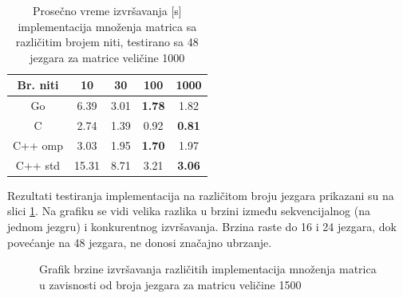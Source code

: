 \documentclass[12pt,oneside]{memoir}
\begin{document}
\begin{table}
\begin{center}
\caption{Prosečno vreme izvršavanja [s] implementacija množenja matrica sa različitim brojem niti, testirano sa 48 jezgara za matrice veličine 1000}
\begin{tabular}{||c||c c c c||}
\hline
Br. niti		&10&30 &100 &1000\\ \hline
Go		&6.39	&3.01&\textbf{1.78}&1.82	 \\ \hline
C		&2.74	&1.39&0.92&\textbf{0.81} \\ \hline
C++ omp	&3.03	&1.95&\textbf{1.70}&1.97 \\ \hline
C++ std	&15.31&8.71&3.21&\textbf{3.06} \\ \hline
\end{tabular}
\label{tab:matrix5}
\end{center}
\end{table}

Rezultati testiranja implementacija na različitom broju jezgara prikazani su na slici \ref{fig:matrix3}. Na grafiku se vidi velika razlika u brzini između sekvencijalnog (na jednom jezgru) i konkurentnog izvršavanja. Brzina raste do 16 i 24 jezgara, dok povećanje na 48 jezgara, ne donosi značajno ubrzanje. 

\begin{figure}
\begin{center}


\caption{Grafik brzine izvršavanja različitih implementacija množenja matrica u zavisnosti od broja jezgara za matricu veličine 1500}
\label{fig:matrix3}
\end{center}
\end{figure}
\end{document}
